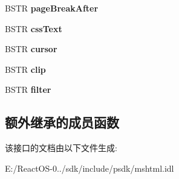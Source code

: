 \begin{DoxyCompactItemize}
B\+S\+TR {\bfseries page\+Break\+After}
\item 
\mbox{\label{interface_m_s_h_t_m_l_1_1_i_h_t_m_l_rule_style_a8f49f9ede193211ac6e0fefcef679fb6}} 
B\+S\+TR {\bfseries css\+Text}
\item 
\mbox{\label{interface_m_s_h_t_m_l_1_1_i_h_t_m_l_rule_style_a3d6dccc9af5fd97b31f44d2094b88566}} 
B\+S\+TR {\bfseries cursor}
\item 
\mbox{\label{interface_m_s_h_t_m_l_1_1_i_h_t_m_l_rule_style_a513e66b32653ef69b7b5d4a425a35807}} 
B\+S\+TR {\bfseries clip}
\item 
\mbox{\label{interface_m_s_h_t_m_l_1_1_i_h_t_m_l_rule_style_aa4627098bd4b9f5714b44380e99de257}} 
B\+S\+TR {\bfseries filter}
\end{DoxyCompactItemize}
\subsection*{额外继承的成员函数}


该接口的文档由以下文件生成\+:\begin{DoxyCompactItemize}
\item 
E\+:/\+React\+O\+S-\/0../sdk/include/psdk/mshtml.\+idl\end{DoxyCompactItemize}
